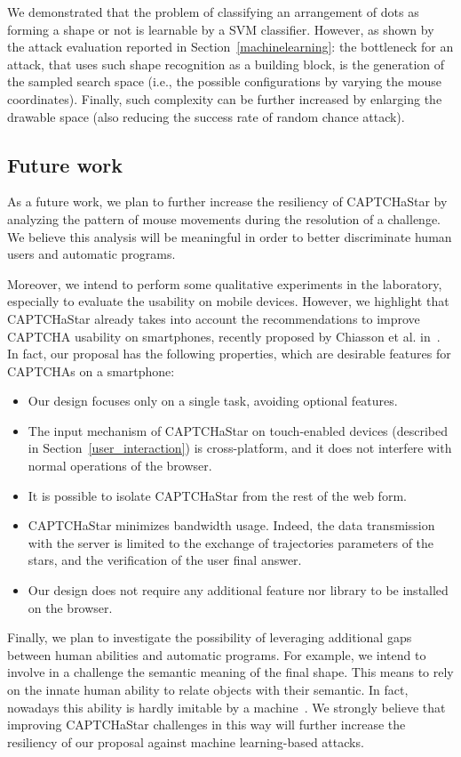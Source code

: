 \documentclass[conference]{IEEEtran}
\newcommand{\hilight}[1]{#1}
\begin{document}
We demonstrated that the problem of classifying an arrangement of dots as forming a shape or not is learnable by a SVM classifier.
However, as shown by the attack evaluation reported in Section~\ref{machinelearning}:
the bottleneck for an attack, that uses such shape recognition as a building block, is the generation of the sampled search space (i.e., the possible configurations by varying the mouse coordinates).
Finally, such complexity can be further increased by enlarging the drawable space (also reducing the success rate of random chance attack).

\subsection{Future work}
\label{futurework}
As a future work, we plan to further increase the resiliency of CAPTCHaStar by analyzing the pattern of mouse movements during the resolution of a challenge.
We believe this analysis will be meaningful in order to better discriminate human users and automatic programs.


Moreover, we intend to perform some qualitative experiments in the laboratory, especially to evaluate the usability on mobile devices.
\hilight{However, we highlight that CAPTCHaStar already takes into account the recommendations to improve CAPTCHA usability on smartphones, recently proposed by Chiasson et al.} in~\cite{chiasson15}.  
In fact, our proposal has the following properties, which are desirable features for CAPTCHAs on a smartphone:
\begin{itemize}[noitemsep,topsep=0pt]
 \item Our design focuses only on a single task, avoiding optional features. \item The input mechanism of CAPTCHaStar on touch-enabled devices (described in Section~\ref{user_interaction}) is cross-platform, and it does not interfere with normal operations of the browser.
 \item It is possible to isolate CAPTCHaStar from the rest of the web form.
 \item CAPTCHaStar minimizes bandwidth usage. Indeed, the data transmission with the server is limited to the exchange of trajectories parameters of the stars, and the verification of the user final answer.
 \item Our design does not require any additional feature nor library to be installed on the browser.
\end{itemize}

Finally, we plan to investigate the possibility of leveraging additional gaps between human abilities and automatic programs. For example, we intend to involve in a challenge the semantic meaning of the final shape.
This means to rely on the innate human ability to relate objects with their semantic. In fact, nowadays this ability is hardly imitable by a machine~\cite{zhu2010attacks}.
We strongly believe that improving CAPTCHaStar challenges in this way will further increase the resiliency of our proposal against machine learning-based attacks.
\end{document}
